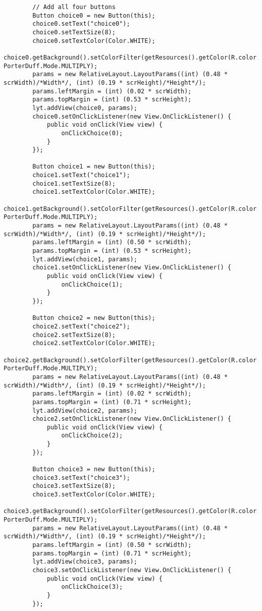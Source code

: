 \begin{lstlisting}
        // Add all four buttons
        Button choice0 = new Button(this);
        choice0.setText("choice0");
        choice0.setTextSize(8);
        choice0.setTextColor(Color.WHITE);
        choice0.getBackground().setColorFilter(getResources().getColor(R.color.colorAccent), PorterDuff.Mode.MULTIPLY);
        params = new RelativeLayout.LayoutParams((int) (0.48 * scrWidth)/*Width*/, (int) (0.19 * scrHeight)/*Height*/);
        params.leftMargin = (int) (0.02 * scrWidth);
        params.topMargin = (int) (0.53 * scrHeight);
        lyt.addView(choice0, params);
        choice0.setOnClickListener(new View.OnClickListener() {
            public void onClick(View view) {
                onClickChoice(0);
            }
        });

        Button choice1 = new Button(this);
        choice1.setText("choice1");
        choice1.setTextSize(8);
        choice1.setTextColor(Color.WHITE);
        choice1.getBackground().setColorFilter(getResources().getColor(R.color.colorPrimary), PorterDuff.Mode.MULTIPLY);
        params = new RelativeLayout.LayoutParams((int) (0.48 * scrWidth)/*Width*/, (int) (0.19 * scrHeight)/*Height*/);
        params.leftMargin = (int) (0.50 * scrWidth);
        params.topMargin = (int) (0.53 * scrHeight);
        lyt.addView(choice1, params);
        choice1.setOnClickListener(new View.OnClickListener() {
            public void onClick(View view) {
                onClickChoice(1);
            }
        });

        Button choice2 = new Button(this);
        choice2.setText("choice2");
        choice2.setTextSize(8);
        choice2.setTextColor(Color.WHITE);
        choice2.getBackground().setColorFilter(getResources().getColor(R.color.colorPrimary), PorterDuff.Mode.MULTIPLY);
        params = new RelativeLayout.LayoutParams((int) (0.48 * scrWidth)/*Width*/, (int) (0.19 * scrHeight)/*Height*/);
        params.leftMargin = (int) (0.02 * scrWidth);
        params.topMargin = (int) (0.71 * scrHeight);
        lyt.addView(choice2, params);
        choice2.setOnClickListener(new View.OnClickListener() {
            public void onClick(View view) {
                onClickChoice(2);
            }
        });

        Button choice3 = new Button(this);
        choice3.setText("choice3");
        choice3.setTextSize(8);
        choice3.setTextColor(Color.WHITE);
        choice3.getBackground().setColorFilter(getResources().getColor(R.color.colorAccent), PorterDuff.Mode.MULTIPLY);
        params = new RelativeLayout.LayoutParams((int) (0.48 * scrWidth)/*Width*/, (int) (0.19 * scrHeight)/*Height*/);
        params.leftMargin = (int) (0.50 * scrWidth);
        params.topMargin = (int) (0.71 * scrHeight);
        lyt.addView(choice3, params);
        choice3.setOnClickListener(new View.OnClickListener() {
            public void onClick(View view) {
                onClickChoice(3);
            }
        });


\end{lstlisting}
